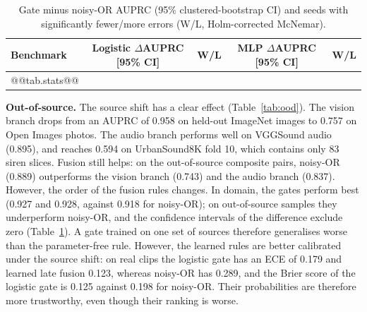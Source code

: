 \documentclass[runningheads,a4paper]{llncs}
\begin{document}
\begin{table}[htbp]
\centering
\caption{Gate minus noisy-OR AUPRC (95\% clustered-bootstrap CI) and seeds
with significantly fewer/more errors (W/L, Holm-corrected McNemar).}
\label{tab:stats}
\scriptsize
\setlength{\tabcolsep}{2pt}
\begin{tabular}{lcccc}
\toprule
Benchmark & Logistic $\Delta$AUPRC [95\% CI] & W/L & MLP $\Delta$AUPRC [95\% CI] & W/L \\
\midrule
@@tab.stats@@
\bottomrule
\end{tabular}
\end{table}

\textbf{Out-of-source.} The source shift has a clear effect
(Table~\ref{tab:ood}). The vision branch drops from an AUPRC of 0.958 on
held-out ImageNet images to 0.757 on Open Images photos. The audio branch
performs well on VGGSound audio (0.895), and reaches 0.594 on UrbanSound8K
fold 10, which contains only 83 siren slices. Fusion still helps: on the
out-of-source composite pairs, noisy-OR (0.889) outperforms the vision branch
(0.743) and the audio branch (0.837). However, the order of the fusion rules
changes. In domain, the gates perform best (0.927 and 0.928, against 0.918 for
noisy-OR); on out-of-source samples they underperform noisy-OR, and the
confidence intervals of the difference exclude zero (Table~\ref{tab:stats}).
A gate trained on one set of sources therefore generalises worse than the
parameter-free rule. However, the learned rules are better calibrated under
the source shift: on real clips the logistic gate has an ECE of 0.179 and
learned late fusion 0.123, whereas noisy-OR has 0.289, and the Brier score of
the logistic gate is 0.125 against 0.198 for noisy-OR. Their probabilities are
therefore more trustworthy, even though their ranking is worse.

\begin{table}[htbp]
\centering
\caption{Out-of-source test (training on ImageNet and UrbanSound8K only, mean
over @@nseeds_ood@@ seeds). ID: ImageNet--UrbanSound8K pairs; OOD-C: Open
Images--VGGSound pairs; OOD-R: real VGGSound-EV clips. Bold: best value.}
\label{tab:ood}
\end{table}
\end{document}
